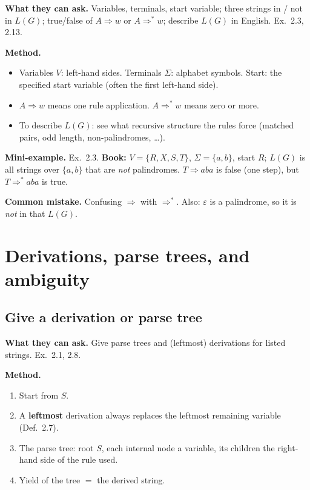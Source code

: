 \documentclass[11pt,a4paper]{article}
\newcommand{\eps}{\varepsilon}
\begin{document}
\textbf{What they can ask.}
Variables, terminals, start variable; three strings in / not in
$L(G)$; true/false of $A\Rightarrow w$ or $A\Rightarrow^* w$;
describe $L(G)$ in English. Ex.~2.3, 2.13.

\textbf{Method.}
\begin{itemize}[nosep]
  \item Variables $V$: left-hand sides. Terminals $\Sigma$: alphabet
        symbols. Start: the specified start variable (often the first
        left-hand side).
  \item $A\Rightarrow w$ means one rule application. $A\Rightarrow^* w$
        means zero or more.
  \item To describe $L(G)$: see what recursive structure the rules
        force (matched pairs, odd length, non-palindromes, \ldots).
\end{itemize}

\textbf{Mini-example.}
Ex.~2.3. \textbf{Book:} $V=\{R,X,S,T\}$, $\Sigma=\{a,b\}$, start
$R$; $L(G)$ is all strings over $\{a,b\}$ that are \emph{not}
palindromes. $T\Rightarrow aba$ is false (one step), but
$T\Rightarrow^* aba$ is true.

\textbf{Common mistake.}
Confusing $\Rightarrow$ with $\Rightarrow^*$. Also: $\eps$ is a
palindrome, so it is \emph{not} in that $L(G)$.

\section{Derivations, parse trees, and ambiguity}
\label{type:derive}

\subsection{Give a derivation or parse tree}

\textbf{What they can ask.}
Give parse trees and (leftmost) derivations for listed strings.
Ex.~2.1, 2.8.

\textbf{Method.}
\begin{enumerate}
  \item Start from $S$.
  \item A \textbf{leftmost} derivation always replaces the leftmost
        remaining variable (Def.~2.7).
  \item The parse tree: root $S$, each internal node a variable, its
        children the right-hand side of the rule used.
  \item Yield of the tree $=$ the derived string.
\end{enumerate}
\end{document}
